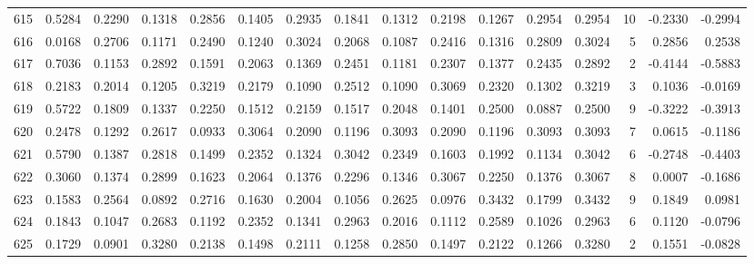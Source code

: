 \begin{tabular}{lrrrrrrrrrrrrrrr}
615 &      0.5284 &  0.2290 &  0.1318 &  0.2856 &  0.1405 &  0.2935 &  0.1841 &  0.1312 &  0.2198 &  0.1267 &   0.2954 &     0.2954 &     10 &                   -0.2330 &                    -0.2994 \\
616 &      0.0168 &  0.2706 &  0.1171 &  0.2490 &  0.1240 &  0.3024 &  0.2068 &  0.1087 &  0.2416 &  0.1316 &   0.2809 &     0.3024 &      5 &                    0.2856 &                     0.2538 \\
617 &      0.7036 &  0.1153 &  0.2892 &  0.1591 &  0.2063 &  0.1369 &  0.2451 &  0.1181 &  0.2307 &  0.1377 &   0.2435 &     0.2892 &      2 &                   -0.4144 &                    -0.5883 \\
618 &      0.2183 &  0.2014 &  0.1205 &  0.3219 &  0.2179 &  0.1090 &  0.2512 &  0.1090 &  0.3069 &  0.2320 &   0.1302 &     0.3219 &      3 &                    0.1036 &                    -0.0169 \\
619 &      0.5722 &  0.1809 &  0.1337 &  0.2250 &  0.1512 &  0.2159 &  0.1517 &  0.2048 &  0.1401 &  0.2500 &   0.0887 &     0.2500 &      9 &                   -0.3222 &                    -0.3913 \\
620 &      0.2478 &  0.1292 &  0.2617 &  0.0933 &  0.3064 &  0.2090 &  0.1196 &  0.3093 &  0.2090 &  0.1196 &   0.3093 &     0.3093 &      7 &                    0.0615 &                    -0.1186 \\
621 &      0.5790 &  0.1387 &  0.2818 &  0.1499 &  0.2352 &  0.1324 &  0.3042 &  0.2349 &  0.1603 &  0.1992 &   0.1134 &     0.3042 &      6 &                   -0.2748 &                    -0.4403 \\
622 &      0.3060 &  0.1374 &  0.2899 &  0.1623 &  0.2064 &  0.1376 &  0.2296 &  0.1346 &  0.3067 &  0.2250 &   0.1376 &     0.3067 &      8 &                    0.0007 &                    -0.1686 \\
623 &      0.1583 &  0.2564 &  0.0892 &  0.2716 &  0.1630 &  0.2004 &  0.1056 &  0.2625 &  0.0976 &  0.3432 &   0.1799 &     0.3432 &      9 &                    0.1849 &                     0.0981 \\
624 &      0.1843 &  0.1047 &  0.2683 &  0.1192 &  0.2352 &  0.1341 &  0.2963 &  0.2016 &  0.1112 &  0.2589 &   0.1026 &     0.2963 &      6 &                    0.1120 &                    -0.0796 \\
625 &      0.1729 &  0.0901 &  0.3280 &  0.2138 &  0.1498 &  0.2111 &  0.1258 &  0.2850 &  0.1497 &  0.2122 &   0.1266 &     0.3280 &      2 &                    0.1551 &                    -0.0828 \\

\end{tabular}
